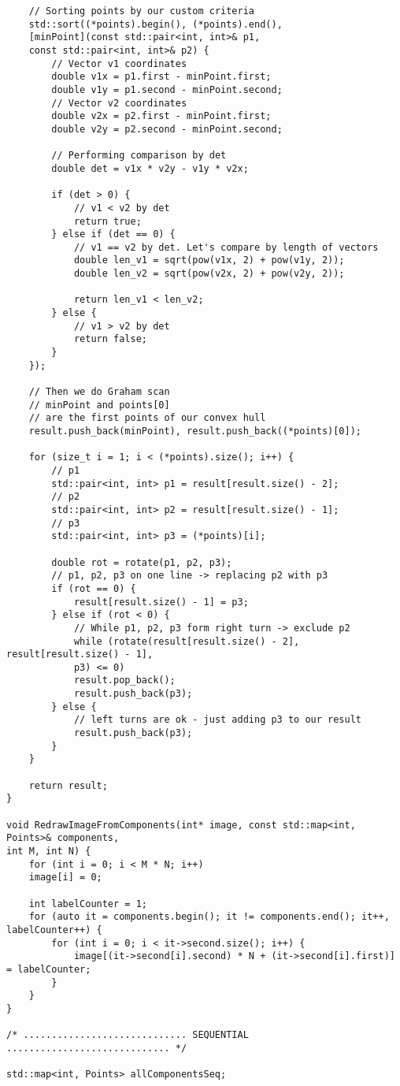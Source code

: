 \documentclass[14pt, russian]{extarticle}
\begin{document}
\begin{lstlisting}
	// Sorting points by our custom criteria
	std::sort((*points).begin(), (*points).end(),
	[minPoint](const std::pair<int, int>& p1,
	const std::pair<int, int>& p2) {
		// Vector v1 coordinates
		double v1x = p1.first - minPoint.first;
		double v1y = p1.second - minPoint.second;
		// Vector v2 coordinates
		double v2x = p2.first - minPoint.first;
		double v2y = p2.second - minPoint.second;
		
		// Performing comparison by det
		double det = v1x * v2y - v1y * v2x;
		
		if (det > 0) {
			// v1 < v2 by det
			return true;
		} else if (det == 0) {
			// v1 == v2 by det. Let's compare by length of vectors
			double len_v1 = sqrt(pow(v1x, 2) + pow(v1y, 2));
			double len_v2 = sqrt(pow(v2x, 2) + pow(v2y, 2));
			
			return len_v1 < len_v2;
		} else {
			// v1 > v2 by det
			return false;
		}
	});
	
	// Then we do Graham scan
	// minPoint and points[0]
	// are the first points of our convex hull
	result.push_back(minPoint), result.push_back((*points)[0]);
	
	for (size_t i = 1; i < (*points).size(); i++) {
		// p1
		std::pair<int, int> p1 = result[result.size() - 2];
		// p2
		std::pair<int, int> p2 = result[result.size() - 1];
		// p3
		std::pair<int, int> p3 = (*points)[i];
		
		double rot = rotate(p1, p2, p3);
		// p1, p2, p3 on one line -> replacing p2 with p3
		if (rot == 0) {
			result[result.size() - 1] = p3;
		} else if (rot < 0) {
			// While p1, p2, p3 form right turn -> exclude p2
			while (rotate(result[result.size() - 2], result[result.size() - 1],
			p3) <= 0)
			result.pop_back();
			result.push_back(p3);
		} else {
			// left turns are ok - just adding p3 to our result
			result.push_back(p3);
		}
	}
	
	return result;
}

void RedrawImageFromComponents(int* image, const std::map<int, Points>& components,
int M, int N) {
	for (int i = 0; i < M * N; i++)
	image[i] = 0;
	
	int labelCounter = 1;
	for (auto it = components.begin(); it != components.end(); it++, labelCounter++) {
		for (int i = 0; i < it->second.size(); i++) {
			image[(it->second[i].second) * N + (it->second[i].first)] = labelCounter;
		}
	}
}

/* ............................. SEQUENTIAL ............................. */

std::map<int, Points> allComponentsSeq;


\end{lstlisting}
\end{document}
